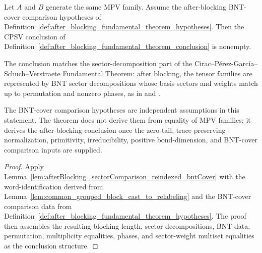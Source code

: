 \begin{lemma}%
\label{lem:fundamental_theorem_after_blocking_comparison_hypotheses}
	\leanok
	Let $A$ and $B$ generate the same MPV family. Assume the after-blocking
	BNT-cover comparison hypotheses of
	Definition~\ref{def:after_blocking_fundamental_theorem_hypotheses}. Then the
	CPSV conclusion of
	Definition~\ref{def:after_blocking_fundamental_theorem_conclusion} is
	nonempty.

	The conclusion matches the sector-decomposition part of the
	Cirac--P\'erez-Garc\'ia--Schuch--Verstraete Fundamental Theorem: after
	blocking, the tensor families are represented by BNT sector decompositions
	whose basis sectors and weights match up to permutation and nonzero phases,
	as in \cite{Cirac2016MPDO_arXiv} and \cite{Cirac2021Matrix}.

	The BNT-cover comparison hypotheses are independent assumptions in this
	statement. The theorem does not derive them from equality of MPV families;
	it derives the after-blocking conclusion once the zero-tail,
	trace-preserving normalization, primitivity, irreducibility, positive
	bond-dimension, and BNT-cover comparison inputs are supplied.
\end{lemma}

	\begin{proof}
		\leanok
		Apply
		Lemma~\ref{lem:afterBlocking_sectorComparison_reindexed_bntCover} with
			the word-identification derived from
		Lemma~\ref{lem:common_grouped_block_cast_to_relabeling} and the BNT-cover
		comparison data from
		Definition~\ref{def:after_blocking_fundamental_theorem_hypotheses}. The proof
	then assembles the resulting blocking length, sector decompositions, BNT data,
	permutation, multiplicity equalities, phases, and sector-weight
	multiset equalities as the conclusion structure.
\end{proof}

